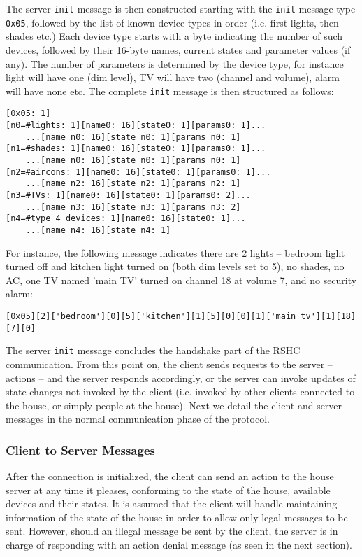 \noindent
The server {\tt init} message is then constructed starting with the {\tt init} message type {\tt 0x05}, followed by the list of known device types in order (i.e. first lights, then shades etc.) Each device type starts with a byte indicating the number of such devices, followed by their 16-byte names, current states and parameter values (if any). The number of parameters is determined by the device type, for instance light will have one (dim level), TV will have two (channel and volume), alarm will have none etc. The complete {\tt init} message is then structured as follows:

\begin{verbatim}
[0x05: 1]
[n0=#lights: 1][name0: 16][state0: 1][params0: 1]...
    ...[name n0: 16][state n0: 1][params n0: 1]
[n1=#shades: 1][name0: 16][state0: 1][params0: 1]...
    ...[name n0: 16][state n0: 1][params n0: 1]
[n2=#aircons: 1][name0: 16][state0: 1][params0: 1]...
    ...[name n2: 16][state n2: 1][params n2: 1]
[n3=#TVs: 1][name0: 16][state0: 1][params0: 2]...
    ...[name n3: 16][state n3: 1][params n3: 2]
[n4=#type 4 devices: 1][name0: 16][state0: 1]...
    ...[name n4: 16][state n4: 1]
\end{verbatim}

\noindent
For instance, the following message indicates there are 2 lights -- bedroom light turned off and kitchen light turned on (both dim levels set to 5), no shades, no AC, one TV named 'main TV' turned on channel 18 at volume 7, and no security alarm:

\begin{verbatim}
[0x05][2]['bedroom'][0][5]['kitchen'][1][5][0][0][1]['main tv'][1][18][7][0]
\end{verbatim}

\noindent
The server {\tt init} message concludes the handshake part of the RSHC communication. From this point on, the client sends requests to the server -- actions -- and the server responds accordingly, or the server can invoke updates of state changes not invoked by the client (i.e. invoked by other clients connected to the house, or simply people at the house). Next we detail the client and server messages in the normal communication phase of the protocol.


\subsubsection{Client to Server Messages}
\label{sec:pdus:pdu:c_to_s}

After the connection is initialized, the client can send an action to the house server at any time it pleases, conforming to the state of the house, available devices and their states. It is assumed that the client will handle maintaining information of the state of the house in order to allow only legal messages to be sent. However, should an illegal message be sent by the client, the server is in charge of responding with an action denial message (as seen in the next section).

